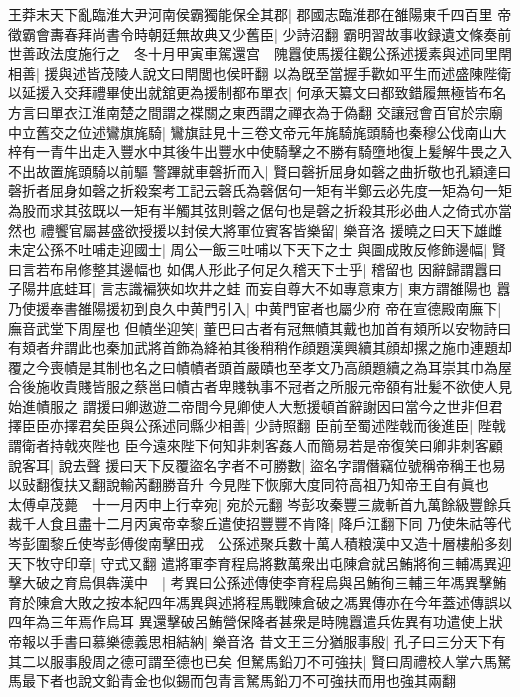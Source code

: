 王莽末天下亂臨淮大尹河南侯霸獨能保全其郡|{
	郡國志臨淮郡在雒陽東千四百里}
帝徵霸會夀春拜尚書令時朝廷無故典又少舊臣|{
	少詩沼翻}
霸明習故事收録遺文條奏前世善政法度施行之　冬十月甲寅車駕還宫　隗囂使馬援往觀公孫述援素與述同里閈相善|{
	援與述皆茂陵人說文曰閈閭也侯旰翻}
以為旣至當握手歡如平生而述盛陳陛衛以延援入交拜禮畢使出就舘更為援制都布單衣|{
	何承天纂文曰都致錯履無極皆布名方言曰單衣江淮南楚之間謂之褋關之東西謂之禪衣為于偽翻}
交讓冠會百官於宗廟中立舊交之位述鸞旗旄騎|{
	鸞旗註見十三卷文帝元年旄騎旄頭騎也秦穆公伐南山大梓有一青牛出走入豐水中其後牛出豐水中使騎擊之不勝有騎墮地復上髪解牛畏之入不出故置旄頭騎以前驅}
警蹕就車磬折而入|{
	賢曰磬折屈身如磬之曲折敬也孔穎達曰磬折者屈身如磬之折殺案考工記云磬氏為磬倨句一矩有半鄭云必先度一矩為句一矩為股而求其弦既以一矩有半觸其弦則磬之倨句也是磬之折殺其形必曲人之倚式亦當然也}
禮饗官屬甚盛欲授援以封侯大將軍位賓客皆樂留|{
	樂音洛}
援曉之曰天下雄雌未定公孫不吐哺走迎國士|{
	周公一飯三吐哺以下天下之士}
與圖成敗反修飾邊幅|{
	賢曰言若布帛修整其邊幅也}
如偶人形此子何足久稽天下士乎|{
	稽留也}
因辭歸謂囂曰子陽井底蛙耳|{
	言志識褊狹如坎井之蛙}
而妄自尊大不如專意東方|{
	東方謂雒陽也}
囂乃使援奉書雒陽援初到良久中黄門引入|{
	中黄門宦者也屬少府}
帝在宣德殿南廡下|{
	廡音武堂下周屋也}
但幘坐迎笑|{
	董巴曰古者有冠無幘其戴也加首有頍所以安物詩曰有頍者弁謂此也秦加武將首飾為絳袙其後稍稍作顔題漢興續其顔却摞之施巾連題却覆之今喪幘是其制也名之曰幘幘者頭首嚴賾也至孝文乃高顔題續之為耳崇其巾為屋合後施收貴賤皆服之蔡邕曰幘古者卑賤執事不冠者之所服元帝頟有壯髪不欲使人見始進幘服之}
謂援曰卿遨遊二帝間今見卿使人大慙援頓首辭謝因曰當今之世非但君擇臣臣亦擇君矣臣與公孫述同縣少相善|{
	少詩照翻}
臣前至蜀述陛戟而後進臣|{
	陛戟謂衛者持戟夾陛也}
臣今遠來陛下何知非刺客姦人而簡易若是帝復笑曰卿非刺客顧說客耳|{
	說去聲}
援曰天下反覆盜名字者不可勝數|{
	盜名字謂僭竊位號稱帝稱王也易以䜴翻復扶又翻說輸芮翻勝音升}
今見陛下恢廓大度同符高祖乃知帝王自有眞也　太傅卓茂薨　十一月丙申上行幸宛|{
	宛於元翻}
岑彭攻秦豐三歲斬首九萬餘級豐餘兵裁千人食且盡十二月丙寅帝幸黎丘遣使招豐豐不肯降|{
	降戶江翻下同}
乃使朱祜等代岑彭圍黎丘使岑彭傅俊南擊田戎　公孫述聚兵數十萬人積粮漢中又造十層樓船多刻天下牧守印章|{
	守式又翻}
遣將軍李育程烏將數萬衆出屯陳倉就呂鮪將徇三輔馮異迎擊大破之育烏俱犇漢中　|{
	考異曰公孫述傳使李育程烏與呂鮪徇三輔三年馮異擊鮪育於陳倉大敗之按本紀四年馮異與述將程馬戰陳倉破之馮異傳亦在今年蓋述傳誤以四年為三年焉作烏耳}
異還擊破呂鮪營保降者甚衆是時隗囂遣兵佐異有功遣使上狀帝報以手書曰慕樂德義思相結納|{
	樂音洛}
昔文王三分猶服事殷|{
	孔子曰三分天下有其二以服事殷周之德可謂至德也已矣}
但駑馬鉛刀不可強扶|{
	賢曰周禮校人掌六馬駑馬最下者也說文鉛青金也似錫而包青言駑馬鉛刀不可強扶而用也強其兩翻}
